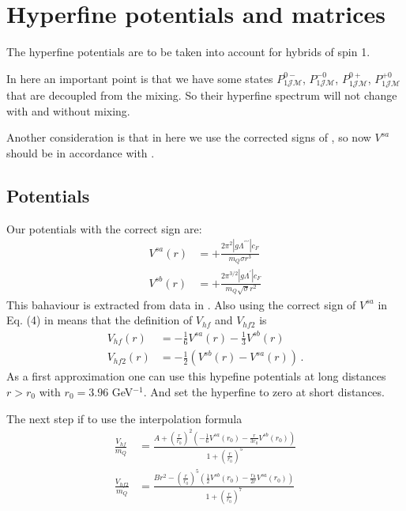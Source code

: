 \documentclass[11pt, a4paper]{article}
\begin{document}
\section{Hyperfine potentials and matrices}
The hyperfine potentials are to be taken into account for hybrids of spin 1.

In here an important point is that we have some states $P_{1\mathcal{J}\mathcal{M}}^{0-}$, $P_{1\mathcal{J}\mathcal{M}}^{-0}$, $P_{1\mathcal{J}\mathcal{M}}^{0+}$, $P_{1\mathcal{J}\mathcal{M}}^{+0}$ that are decoupled from the mixing. So their hyperfine spectrum will not change with and without mixing.

Another consideration is that in here we use the corrected signs of \cite{Soto:2023lbh}, so now $V^{sa}$ should be in accordance with \cite{Soto:2020xpm}.

\subsection{Potentials}
Our potentials with the correct sign are:
\begin{equation}
    \begin{aligned}
    V^{sa}(r) & = +\frac{2\pi^2 |g\Lambda^{\prime\prime\prime}| c_F}{m_Q\sigma r^3 } \\
    V^{sb}(r) & = + \frac{2\pi^{3/2} |g\Lambda^{\prime}| c_F}{m_Q \sqrt{\sigma} r^2 }
    \end{aligned}
\end{equation}
This bahaviour is extracted from data in \cite{Schlosser:2025tca}. 
Also using the correct sign of $V^{sa}$ in Eq. (4) in \cite{Soto:2023lbh} means that the definition of $V_{hf}$ and $V_{hf2}$ is
\begin{equation}
\label{hf_long}
    \begin{aligned}
        V_{hf}(r) &= - \frac{1}{6} V^{sa}(r) - \frac{1}{3}V^{sb}(r) \\
        V_{hf2}(r) &= - \frac{1}{2} \left( V^{sb}(r) - V^{sa}(r) \right) \, .
    \end{aligned}
\end{equation}
As a first approximation one can use this hypefine potentials at long distances $r > r_0$ with $r_0=3.96$ GeV$^{-1}$. And set the hyperfine to zero at short distances.

The next step if to use the interpolation formula
\begin{equation}
\label{hf_interpol}
   \begin{aligned}
       \frac{V_{hf}}{m_Q} &= \frac{A + \left(\frac{r}{r_0}\right)^2 \left( - \frac{1}{6} V^{sa}(r_0) - \frac{r}{3r_0}V^{sb}(r_0) \right)}{1 + \left( \frac{r}{r_0}\right)^5} \\
       \frac{V_{hf2}}{m_Q} &= \frac{Br^2 - \left(\frac{r}{r_0}\right)^5 \left( \frac{1}{2} V^{sb}(r_0) - \frac{r_0}{2r}V^{sa}(r_0) \right)}{1 + \left( \frac{r}{r_0}\right)^7} 
   \end{aligned} 
\end{equation}
\end{document}
